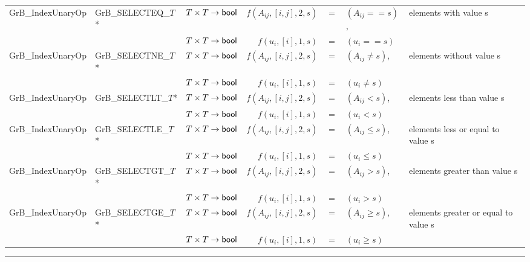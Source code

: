\begin{landscape}
\begin{table*}
\begin{threeparttable}
\begin{tabular}{l|l|l|rcll}
{\sf GrB\_IndexUnaryOp}   & {\sf GrB\_SELECTEQ\_$T$}*  & $T \times T \rightarrow {\sf bool} $ & $f(A_{ij},[i,j],2,s)$ & $=$ & $(A_{ij} == s)$, & elements with value s \\
                          &                            & $T \times T \rightarrow {\sf bool} $ & $f(u_{i},[i],1,s)$ & $=$ & $(u_{i} == s)$ \\
{\sf GrB\_IndexUnaryOp}   & {\sf GrB\_SELECTNE\_$T$}*  & $T \times T \rightarrow {\sf bool} $ & $f(A_{ij},[i,j],2,s)$ & $=$ & $(A_{ij} \neq s)$, & elements without value s \\
                          &                            & $T \times T \rightarrow {\sf bool} $ & $f(u_{i},[i],1,s)$ & $=$ & $(u_{i} \neq s)$ \\
{\sf GrB\_IndexUnaryOp}   & {\sf GrB\_SELECTLT\_$T$}*  & $T \times T \rightarrow {\sf bool} $ & $f(A_{ij},[i,j],2,s)$ & $=$ & $(A_{ij} < s)$, & elements less than value s \\
                          &                            & $T \times T \rightarrow {\sf bool} $ & $f(u_{i},[i],1,s)$ & $=$ & $(u_{i} < s)$ \\
{\sf GrB\_IndexUnaryOp}   & {\sf GrB\_SELECTLE\_$T$}*  & $T \times T \rightarrow {\sf bool} $ & $f(A_{ij},[i,j],2,s)$ & $=$ & $(A_{ij} \leq s)$, & elements less or equal to value s \\
                          &                            & $T \times T \rightarrow {\sf bool} $ & $f(u_{i},[i],1,s)$ & $=$ & $(u_{i} \leq s)$ \\
{\sf GrB\_IndexUnaryOp}   & {\sf GrB\_SELECTGT\_$T$}*  & $T \times T \rightarrow {\sf bool} $ & $f(A_{ij},[i,j],2,s)$ & $=$ & $(A_{ij} > s)$, & elements greater than value s \\
                          &                            & $T \times T \rightarrow {\sf bool} $ & $f(u_{i},[i],1,s)$ & $=$ & $(u_{i} > s)$ \\
{\sf GrB\_IndexUnaryOp}   & {\sf GrB\_SELECTGE\_$T$}*  & $T \times T \rightarrow {\sf bool} $ & $f(A_{ij},[i,j],2,s)$ & $=$ & $(A_{ij} \geq s)$, & elements greater or equal to value s \\
                          &                            & $T \times T \rightarrow {\sf bool} $ & $f(u_{i},[i],1,s)$ & $=$ & $(u_{i} \geq s)$ \\
\end{tabular}
\hrule
\end{threeparttable}
\end{table*}

\end{landscape}

